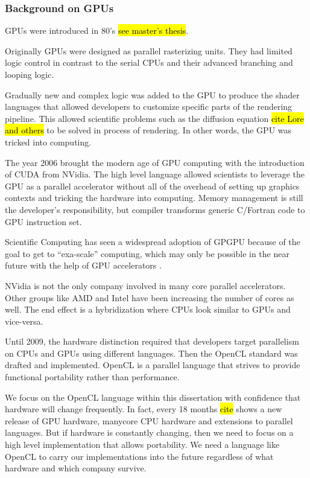 \subsubsection{Background on GPUs} 

GPUs were introduced in 80's \hl{see master's thesis}.

Originally GPUs were designed as parallel rasterizing units. They had limited logic control in contrast to the serial CPUs and their advanced branching and looping logic. 

Gradually new and complex logic was added to the GPU to produce the shader languages that allowed developers to customize specific parts of the rendering pipeline. This allowed scientific problems such as the diffusion equation \hl{cite Lore and others} to be solved in process of rendering. In other words, the GPU was tricked into computing.

The year 2006 brought the modern age of GPU computing with the introduction of CUDA from NVidia. The high level language allowed scientists to leverage the GPU as a parallel accelerator without all of the overhead of setting up graphics contexts and tricking the hardware into computing. Memory management is still the developer's responsibility, but compiler transforms generic C/Fortran code to GPU instruction set. 

Scientific Computing has seen a widespread adoption of GPGPU because of the goal to get to ``exa-scale'' computing, which may only be possible in the near future with the help of GPU accelerators \cite{GPUandExascale2011}. 

NVidia is not the only company involved in many core parallel accelerators. Other groups like AMD and Intel have been increasing the number of cores as well. The end effect is a hybridization where CPUs look similar to GPUs and vice-versa. 

Until 2009, the hardware distinction required that developers target parallelism on CPUs and GPUs using different languages. Then the OpenCL standard was drafted and implemented. OpenCL is a parallel language that strives to provide functional portability rather than performance. 

We focus on the OpenCL language within this dissertation with confidence that hardware will change frequently. In fact, every 18 months \hl{cite} shows a new release of GPU hardware, manycore CPU hardware and extensions to parallel languages. But if hardware is constantly changing, then we need to focus on a high level implementation that allows portability. We need a language like OpenCL to carry our implementations into the future regardless of what hardware and which company survive. 

